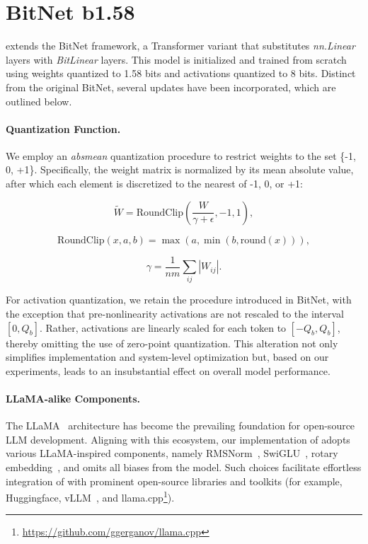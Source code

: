 \section{BitNet b1.58}

 extends the BitNet framework, a Transformer variant that substitutes \emph{nn.Linear} layers with \emph{BitLinear} layers. This model is initialized and trained from scratch using weights quantized to 1.58 bits and activations quantized to 8 bits. Distinct from the original BitNet, several updates have been incorporated, which are outlined below.

\paragraph{Quantization Function.} We employ an \emph{absmean} quantization procedure to restrict weights to the set \{-1, 0, +1\}. Specifically, the weight matrix is normalized by its mean absolute value, after which each element is discretized to the nearest of -1, 0, or +1:

\begin{equation}
    \widetilde{W} = \mathrm{RoundClip}(\frac{W}{\gamma + \epsilon}, -1, 1),
\end{equation}

\begin{equation}
    \mathrm{RoundClip}(x, a, b) = \max(a, \min(b, \mathrm{round}(x))),
\end{equation}

\begin{equation}
    \gamma = \frac{1}{nm}\sum_{ij} |W_{ij}|.
\end{equation}

For activation quantization, we retain the procedure introduced in BitNet, with the exception that pre-nonlinearity activations are not rescaled to the interval $[0, Q_b]$. Rather, activations are linearly scaled for each token to $[-Q_b, Q_b]$, thereby omitting the use of zero-point quantization. This alteration not only simplifies implementation and system-level optimization but, based on our experiments, leads to an insubstantial effect on overall model performance.

\paragraph{LLaMA-alike Components.}

The LLaMA~\cite{llama, llama2} architecture has become the prevailing foundation for open-source LLM development. Aligning with this ecosystem, our implementation of  adopts various LLaMA-inspired components, namely RMSNorm~\cite{rmsnorm}, SwiGLU~\cite{swiglu}, rotary embedding~\cite{rope}, and omits all biases from the model. Such choices facilitate effortless integration of  with prominent open-source libraries and toolkits (for example, Huggingface, vLLM~\cite{vllm}, and llama.cpp\footnote{\url{https://github.com/ggerganov/llama.cpp}}).

